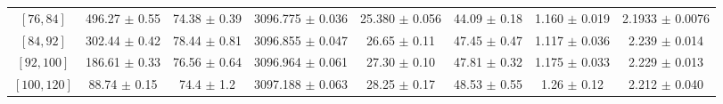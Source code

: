 \begin{tabular}{c||c|c|c|c|c|c|c}
$[76, 84]$ & 496.27 $\pm$ 0.55 & 74.38 $\pm$ 0.39 & 3096.775 $\pm$ 0.036 & 25.380 $\pm$ 0.056 & 44.09 $\pm$ 0.18 & 1.160 $\pm$ 0.019 & 2.1933 $\pm$ 0.0076\\
$[84, 92]$ & 302.44 $\pm$ 0.42 & 78.44 $\pm$ 0.81 & 3096.855 $\pm$ 0.047 & 26.65 $\pm$ 0.11 & 47.45 $\pm$ 0.47 & 1.117 $\pm$ 0.036 & 2.239 $\pm$ 0.014\\
$[92, 100]$ & 186.61 $\pm$ 0.33 & 76.56 $\pm$ 0.64 & 3096.964 $\pm$ 0.061 & 27.30 $\pm$ 0.10 & 47.81 $\pm$ 0.32 & 1.175 $\pm$ 0.033 & 2.229 $\pm$ 0.013\\
$[100, 120]$ & 88.74 $\pm$ 0.15 & 74.4 $\pm$ 1.2 & 3097.188 $\pm$ 0.063 & 28.25 $\pm$ 0.17 & 48.53 $\pm$ 0.55 & 1.26 $\pm$ 0.12 & 2.212 $\pm$ 0.040\\
\end{tabular}
